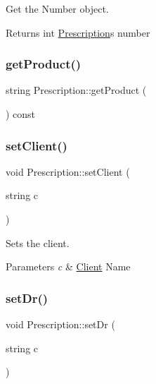Get the Number object. 

\begin{DoxyReturn}{Returns}
int \hyperlink{classPrescription}{Prescription}\textquotesingle{}s number 
\end{DoxyReturn}
\mbox{\label{classPrescription_aca98893524a101d4b42fd5ef4ea1ed51}} 
\subsubsection{\texorpdfstring{get\+Product()}{getProduct()}}
{\footnotesize\ttfamily string Prescription\+::get\+Product (\begin{DoxyParamCaption}{ }\end{DoxyParamCaption}) const}

\mbox{\label{classPrescription_a2c0f9433fda32c1ef8d4e96ff3b965b0}} 
\subsubsection{\texorpdfstring{set\+Client()}{setClient()}}
{\footnotesize\ttfamily void Prescription\+::set\+Client (\begin{DoxyParamCaption}\item[{string}]{c }\end{DoxyParamCaption})}



Sets the client. 


\begin{DoxyParams}{Parameters}
{\em c} & \hyperlink{classClient}{Client} Name \\
\hline
\end{DoxyParams}
\mbox{\label{classPrescription_ac2623f2ff21c5b0b454913c66e5f40a0}} 
\subsubsection{\texorpdfstring{set\+Dr()}{setDr()}}
{\footnotesize\ttfamily void Prescription\+::set\+Dr (\begin{DoxyParamCaption}\item[{string}]{c }\end{DoxyParamCaption})}



